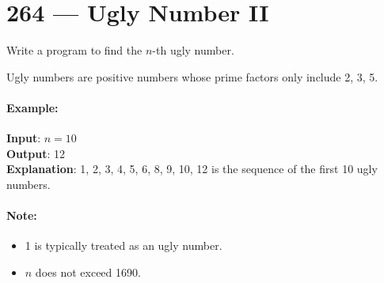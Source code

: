 \section{264 --- Ugly Number II}
Write a program to find the $n$-th ugly number.
\par
Ugly numbers are positive numbers whose prime factors only include 2, 3, 5. 

\paragraph{Example:}

\begin{flushleft}
\textbf{Input}: $n = 10$
\\
\textbf{Output}: 12
\\
\textbf{Explanation}: 1, 2, 3, 4, 5, 6, 8, 9, 10, 12 is the sequence of the first 10 ugly numbers.
\end{flushleft}

\paragraph{Note:}  

\begin{itemize}
\item 1 is typically treated as an ugly number.
\item $n$ does not exceed 1690.
\end{itemize}
